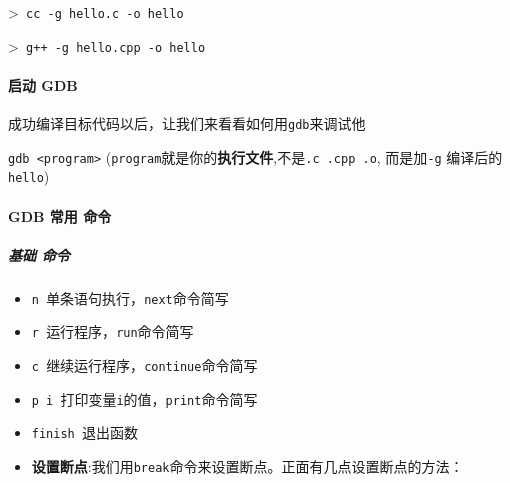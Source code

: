 \documentclass[UTF8,a4paper,12pt]{ctexbook} %
\begin{document}
				>\verb| cc -g hello.c -o hello|
				
				>\verb| g++ -g hello.cpp -o hello|
				
			\paragraph{启动 GDB}
				成功编译目标代码以后，让我们来看看如何用\verb|gdb|来调试他
				
				\verb|gdb <program>| (\verb|program|就是你的\textbf{执行文件},不是\verb|.c .cpp .o|, 而是加\verb|-g| 编译后的\verb|hello|)
				
			
			\paragraph{GDB 常用 命令}
				\subparagraph{基础 命令}
					 \begin{itemize}[itemindent = 1em]
					 	\item \verb|n |单条语句执行，\verb|next|命令简写
					 	\item \verb|r |运行程序，\verb|run|命令简写
					 	\item \verb|c |继续运行程序，\verb|continue|命令简写
					 	\item \verb|p i |打印变量\verb|i|的值，\verb|print|命令简写
					 	\item \verb|finish |退出函数
					 	\item \textbf{设置断点}:我们用\verb|break|命令来设置断点。正面有几点设置断点的方法：
					 	

\end{itemize}
\end{document}
